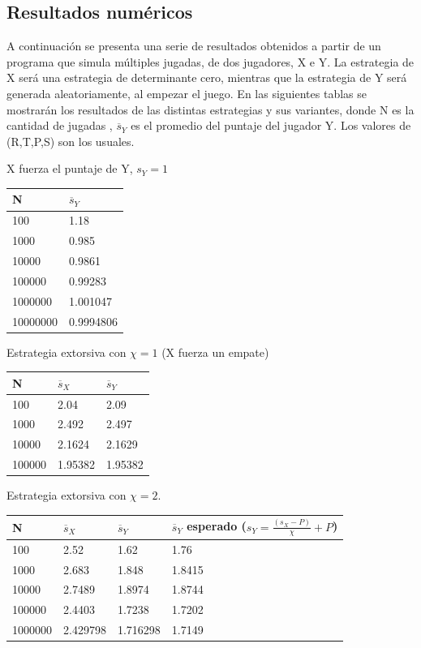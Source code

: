 \documentclass[12pt]{article}
\begin{document}
\subsection{Resultados numéricos}
A continuación se presenta una serie de resultados obtenidos a partir de un programa que simula múltiples jugadas, de dos
jugadores, X e Y. La estrategia de X será una estrategia de determinante cero, mientras que la estrategia de Y será 
generada aleatoriamente, al empezar el juego.
En las siguientes tablas se mostrarán los resultados de las distintas estrategias y sus variantes, donde N es la cantidad de
jugadas , $\overline s_Y$ es el promedio del puntaje del jugador Y. Los valores de (R,T,P,S) son los usuales.\newpage

X fuerza el puntaje de Y, $s_Y=1$
\begin{center}
  \begin{tabular}{| l | l |}
    \hline
    N & $\overline s_Y$ \\\hline
    100 & 1.18 \\\hline
    1000 & 0.985 \\\hline
    10000 & 0.9861 \\\hline
    100000 & 0.99283 \\\hline
    1000000 & 1.001047 \\\hline
    10000000 & 0.9994806 \\\hline
    
  \end{tabular}
\end{center}
Estrategia extorsiva con $\chi=1$ (X fuerza un empate)
\begin{center}
  \begin{tabular}{| l | l | l |}    
    \hline
    N & $\overline s_X$ & $\overline s_Y$ \\\hline
    100 & 2.04 & 2.09 \\\hline
    1000 & 2.492 & 2.497 \\\hline
    10000 & 2.1624 & 2.1629 \\\hline
    100000 & 1.95382 & 1.95382 \\\hline
  \end{tabular}
\end{center}
Estrategia extorsiva con $\chi=2$. 
\begin{center}
  \begin{tabular}{| l | l | l | l |}
    \hline
    N & $\overline s_X$ & $\overline
    s_Y$ & $\overline s_Y$ esperado ($s_Y=\frac{(s_X-P)}{\chi} + P$)\\\hline
    100 & 2.52 & 1.62 & 1.76\\\hline
    1000 & 2.683 & 1.848 & 1.8415  \\\hline
    10000 & 2.7489 & 1.8974 & 1.8744\\\hline
    100000 & 2.4403 & 1.7238 & 1.7202 \\\hline
    1000000 & 2.429798 & 1.716298 & 1.7149 \\\hline
  \end{tabular}
\end{center}
\end{document}
